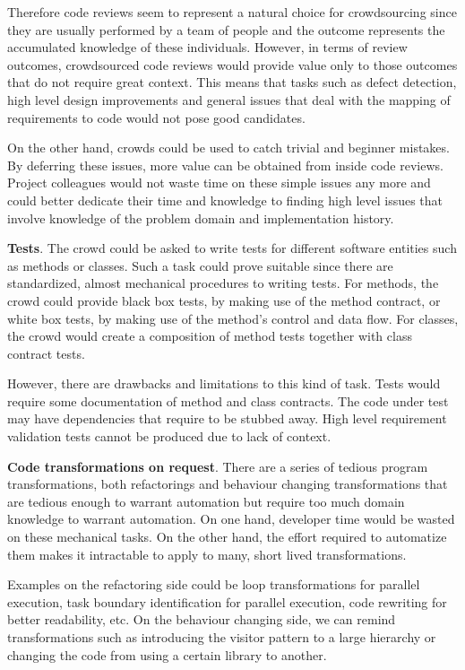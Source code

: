 \documentclass{sigchi}
\begin{document}
Therefore code reviews seem to represent a natural choice for crowdsourcing since they are usually performed by a team of people and the outcome represents the accumulated knowledge of these individuals. However, in terms of review outcomes, crowdsourced code reviews would provide value only to those outcomes that do not require great context. This means that tasks such as defect detection, high level design improvements and general issues that deal with the mapping of requirements to code would not pose good candidates. 

On the other hand, crowds could be used to catch trivial and beginner mistakes. By deferring these issues, more value can be obtained from inside code reviews. Project colleagues would not waste time on these simple issues any more and could better dedicate their time and knowledge to finding high level issues that involve knowledge of the problem domain and implementation history. 

\textbf{Tests}. The crowd could be asked to write tests for different software entities such as methods or classes. Such a task could prove suitable since there are standardized, almost mechanical procedures to writing tests. For methods, the crowd could provide black box tests, by making use of the method contract, or white box tests, by making use of the method's control and data flow. For classes, the crowd would create a composition of method tests together with class contract tests. 

However, there are drawbacks and limitations to this kind of task. Tests would require some documentation of method and class contracts. The code under test may have dependencies that require to be stubbed away. High level requirement validation tests cannot be produced due to lack of context. 

\textbf{Code transformations on request}. There are a series of tedious program transformations, both refactorings and behaviour changing transformations that are tedious enough to warrant automation but require too much domain knowledge to warrant automation. On one hand, developer time would be wasted on these mechanical tasks. On the other hand, the effort required to automatize them makes it intractable to apply to many, short lived transformations. 

Examples on the refactoring side could be loop transformations for parallel execution, task boundary identification for parallel execution, code rewriting for better readability, etc. On the behaviour changing side, we can remind transformations such as introducing the visitor pattern to a large hierarchy or changing the code from using a certain library to another.
\end{document}
